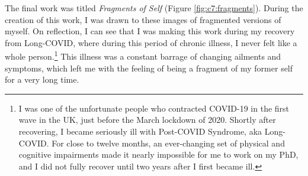 The final work was titled \textit{Fragments of Self} \citeyearpar{broad2021fragments} (Figure \ref{fig:c7:fragments}). 
During the creation of this work, I was  drawn to these images of fragmented versions of myself. 
On reflection, I can see that I was making this work during my recovery from Long-COVID, where during this period of chronic illness, I never felt like a whole person.\footnote{
    I was one of the unfortunate people who contracted COVID-19 in the first wave in the UK, just before the March lockdown of 2020. 
    Shortly after recovering, I became seriously ill with Post-COVID Syndrome, aka Long-COVID.
    For close to twelve months, an ever-changing set of physical and cognitive impairments made it nearly impossible for me to work on my PhD, and I did not fully recover until two years after I first became ill.
} 
This illness was a constant barrage of changing ailments and symptoms, which left me with the feeling of being a fragment of my former self for a very long time.

